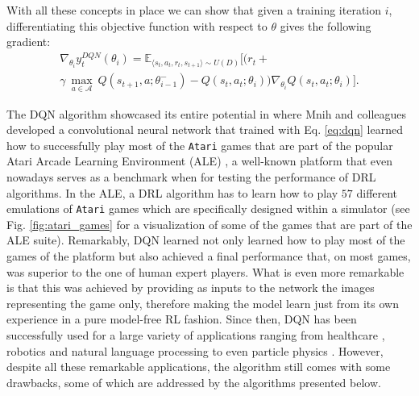 With all these concepts in place we can show that given a training iteration $i$, differentiating this objective function with respect to $\theta$ gives the following gradient: 
\begin{multline}
\nabla_{\theta_{i}}y^{DQN}_{t}(\theta_{i}) = \mathds{E}_{\langle s_{t},a_{t},r_{t},s_{t+1}\rangle\sim U(D)} \bigg[\big(r_{t} + \\ \gamma \: \underset{a\in \mathcal{A}}{\max}\: Q(s_{t+1}, a; \theta^{-}_{i-1})  - Q(s_{t}, a_{t}; \theta_{i})\big)\nabla_{\theta_{i}} Q(s_{t}, a_{t}; \theta_{i})\bigg].
\label{eq:dqn_gradient}
\end{multline}

The DQN algorithm showcased its entire potential in \cite{mnih2015human} where Mnih and colleagues developed a convolutional neural network that trained with Eq. \ref{eq:dqn} learned how to successfully play most of the \texttt{Atari} games that are part of the popular Atari Arcade Learning Environment (ALE) \cite{bellemare2013arcade}, a well-known platform that even nowadays serves as a benchmark when for testing the performance of DRL algorithms. In the ALE, a DRL algorithm has to learn how to play $57$ different emulations of \texttt{Atari} games which are specifically designed within a simulator (see Fig. \ref{fig:atari_games} for a visualization of some of the games that are part of the ALE suite). Remarkably, DQN learned not only learned how to play most of the games of the platform but also achieved a final performance that, on most games, was superior to the one of human expert players. What is even more remarkable is that this was achieved by providing as inputs to the network the images representing the game only, therefore making the model learn just from its own experience in a pure model-free RL fashion. Since then, DQN has been successfully used for a large variety of applications ranging from healthcare \cite{tseng2017deep,raghu2017continuous}, robotics \cite{kalashnikov2018qt} and natural language processing \cite{he2015deep, narasimhan2015language} to even particle physics \cite{liu2017learning, sajedian2020design}. However, despite all these remarkable applications, the algorithm still comes with some drawbacks, some of which are addressed by the algorithms presented below.


